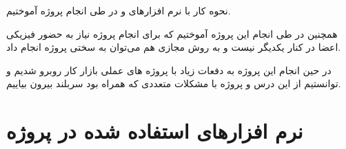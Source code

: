 \documentclass[oneside,a4paper,12pt]{book}
\begin{document}
نحوه کار با نرم افزارهای  و  در طی انجام پروژه آموختیم.

همچنین در طی انجام این پروژه آموختیم که برای انجام پروژه نیاز به حضور فیزیکی اعضا در کنار یکدیگر نیست و به روش مجازی هم می‌توان به سختی پروژه انجام داد.

در حین انجام این پروژه به دفعات زیاد با پروژه های عملی بازار کار روبرو شدیم و توانستیم از این درس و پروژه با مشکلات متعددی که همراه بود سربلند بیرون بیاییم.

\section{نرم افزارهای استفاده شده در پروژه}



\end{document}
